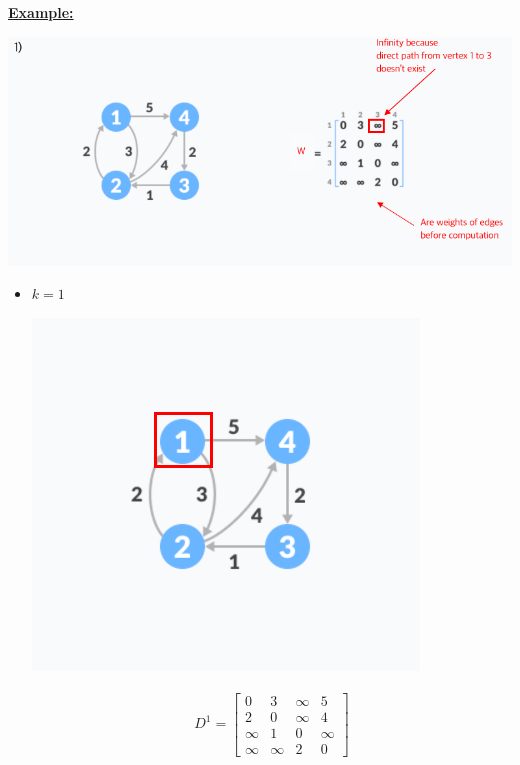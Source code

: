 \documentclass[12pt]{article}
\begin{document}
\begin{enumerate}[1.]
\begin{itemize}
\begin{itemize}
            \bigskip

            \underline{\textbf{Example:}}

            \bigskip

            \begin{center}
            \includegraphics[width=\linewidth]{images/worksheet_4_solution_47.png}
            \end{center}

            \begin{itemize}
                \item $k = 1$

                \begin{center}
                \includegraphics[width=0.5\linewidth]{images/worksheet_4_solution_48.png}
                \end{center}

                \begin{align}
                    D^1 = \begin{bmatrix}
                        0 & 3 & \infty & 5\\
                        2 & 0 & \infty & 4  \\
                        \infty & 1 & 0 & \infty \\
                        \infty & \infty & 2 & 0
                    \end{bmatrix}
                \end{align}


\end{itemize}
\end{itemize}
\end{itemize}
\end{enumerate}
\end{document}
